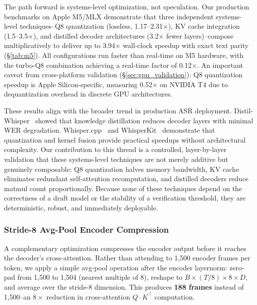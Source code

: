 \documentclass[11pt,a4paper]{article}
\begin{document}
The path forward is systems-level optimization, not speculation. Our production benchmarks on Apple M5/MLX demonstrate that three independent systems-level techniques--Q8 quantization (lossless, 1.17--2.31$\times$), KV cache integration (1.5--3.5$\times$), and distilled decoder architectures (3.2$\times$ fewer layers)--compose multiplicatively to deliver up to 3.94$\times$ wall-clock speedup with exact text parity (\S\ref{tab:m5}). All configurations run faster than real-time on M5 hardware, with the turbo-Q8 combination achieving a real-time factor of 0.12$\times$. An important caveat from cross-platform validation (\S\ref{sec:gpu_validation}): Q8 quantization speedup is Apple Silicon-specific, measuring 0.52$\times$ on NVIDIA T4 due to dequantization overhead in discrete GPU architectures.

These results align with the broader trend in production ASR deployment. Distil-Whisper~\cite{gandhi2023distilwhisper} showed that knowledge distillation reduces decoder layers with minimal WER degradation. Whisper.cpp~\cite{gerganov2023whispercpp} and WhisperKit~\cite{apple2024whisperkit} demonstrate that quantization and kernel fusion provide practical speedups without architectural complexity. Our contribution to this thread is a controlled, layer-by-layer validation that these systems-level techniques are not merely additive but genuinely composable: Q8 quantization halves memory bandwidth, KV cache eliminates redundant self-attention recomputation, and distilled decoders reduce matmul count proportionally. Because none of these techniques depend on the correctness of a draft model or the stability of a verification threshold, they are deterministic, robust, and immediately deployable.

\subsubsection{Stride-8 Avg-Pool Encoder Compression}
\label{sec:stride8}

A complementary optimization compresses the encoder output before it reaches the decoder's cross-attention. Rather than attending to 1,500 encoder frames per token, we apply a simple avg-pool operation after the encoder layernorm: zero-pad from 1,500 to 1,504 (nearest multiple of 8), reshape to $B \times (T/8) \times 8 \times D$, and average over the stride-8 dimension. This produces \textbf{188 frames} instead of 1,500--an $8\times$ reduction in cross-attention $Q \cdot K^\top$ computation.
\end{document}
